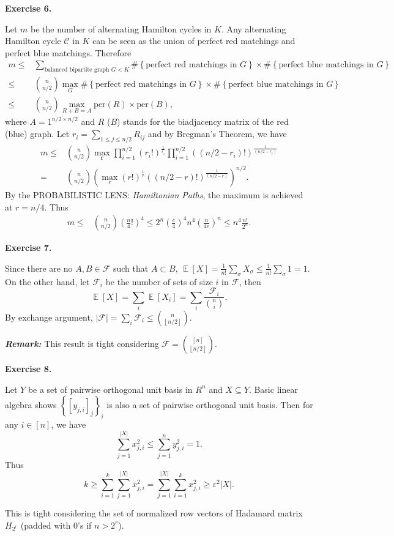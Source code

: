 \documentclass[a4paper]{article}
\newenvironment{exercise}[1]{
	\par
	\noindent\textbf{Exercise #1.}\quad
}{
	\par
	\bigskip
}
\DeclareMathOperator{\E}{\mathbb E}
\newcommand{\pbra}[1]{\left( #1 \right)}
\newcommand{\cbra}[1]{\left\{ #1 \right\}}
\newcommand{\sbra}[1]{\left[ #1 \right]}
\newcommand{\floorbra}[1]{\left\lfloor #1 \right\rfloor}
\newcommand{\per}{\text{per}}
\newcommand{\Ccal}{\mathcal{C}}
\newcommand{\Fcal}{\mathcal{F}}
\begin{document}
\begin{exercise}{6}
    Let $m$ be the number of alternating Hamilton cycles in $K$.
    Any alternating Hamilton cycle $\Ccal$ in $K$ can be seen as the union of perfect red matchings and perfect blue matchings.
    Therefore 
    \begin{align*}
        m\leq&\sum_{\text{balanced bipartite graph }G<K}
        \#\cbra{\text{perfect red matchings in $G$}}\times\#\cbra{\text{perfect blue matchings in $G$}}\\
        \leq&\binom n{n/2}
        \max_G \#\cbra{\text{perfect red matchings in $G$}}\times\#\cbra{\text{perfect blue matchings in $G$}}\\
        \leq&\binom n{n/2}\max_{R+B=A}\per(R)\times\per(B),
    \end{align*}
    where $A=1^{n/2\times n/2}$  
    and $R$ ($B$) stands for the biadjacency matrix of the red (blue) graph.
    Let $r_i=\sum_{1\leq j\leq n/2}R_{ij}$ and by Bregman's Theorem, we have
    \begin{align*}
        m\leq&\binom n{n/2}\max_{\bm r}\prod_{i=1}^{n/2}\pbra{r_i!}^{\frac1{r_i}}\prod_{i=1}^{n/2}
        \pbra{\pbra{n/2-r_i}!}^{\frac1{\pbra{n/2-r_i}}}\\
        =&\binom n{n/2}\pbra{\max_r\pbra{r!}^{\frac1r}\pbra{\pbra{n/2-r}!}^{\frac1{\pbra{n/2-r}}}}^{n/2}.
    \end{align*}
    By the PROBABILISTIC LENS: \textit{Hamiltonian Paths}, the maximum is achieved at $r=n/4$. Thus
    \begin{align*}
        m\leq&\binom n{n/2}\pbra{\frac n4!}^4\leq2^n\pbra{\frac e4}^4n^4\pbra{\frac n{4e}}^n
        \leq n^4\frac{n!}{2^n}.
    \end{align*}
\end{exercise}

\begin{exercise}{7}
    Since there are no $A,B\in\Fcal$ such that $A\subset B$, 
    $\E\sbra{X}=\frac1{n!}\sum_\sigma X_\sigma\leq\frac1{n!}\sum_\sigma 1=1$.
    On the other hand, let $\Fcal_i$ be the number of sets of size $i$ in $\Fcal$, then
    $$
    \E\sbra{X}=\sum_i\E\sbra{X_i}=\sum_i\frac{\Fcal_i}{\binom ni}.
    $$
    By exchange argument, $|\Fcal|=\sum_i\Fcal_i\leq\binom n{\floorbra{n/2}}$.
\end{exercise}
\noindent\textbf{\it Remark:} This result is tight considering $\Fcal=\binom{[n]}{\floorbra{n/2}}$.

\begin{exercise}{8}
    Let $Y$ be a set of pairwise orthogonal unit basis in $R^n$ and $X\subseteq Y$.
    Basic linear algebra shows $\cbra{[y_{j,i}]_j}_i$ is also a set of pairwise orthogonal unit basis.
    Then for any $i\in[n]$, we have 
    $$
    \sum_{j=1}^{|X|}x_{j,i}^2\leq\sum_{j=1}^ny_{j,i}^2=1.
    $$
    Thus
    $$
    k\geq\sum_{i=1}^k\sum_{j=1}^{|X|}x_{j,i}^2=\sum_{j=1}^{|X|}\sum_{i=1}^kx_{j,i}^2\geq\varepsilon^2|X|.
    $$

    This is tight considering the set of normalized row vectors of Hadamard matrix $H_{2^r}$ (padded with $0$'s if $n>2^r$). 
\end{exercise}
\end{document}
